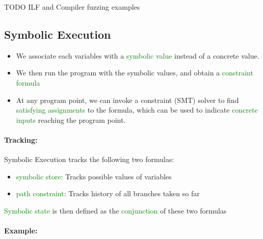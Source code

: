 TODO ILF and Compiler fuzzing examples
\subsection{Symbolic Execution}
\begin{itemize}
\item We associate each variables with a \textcolor{green}{symbolic value} instead of a concrete value.
\item We then run the program with the symbolic values, and obtain a \textcolor{green}{constraint formula}
\item At any program point, we can invoke a constraint (SMT) solver to find \textcolor{green}{satisfying assignments} to the formula, which can be used to indicate \textcolor{green}{concrete inputs} reaching the program point.
\end{itemize}{}

\paragraph{Tracking:}
Symbolic Execution tracks the following two formulas:
\begin{itemize}
    \item \textcolor{green}{symbolic store}: Tracks possible values of variables
    \item \textcolor{green}{path constraint}: Tracks history of all branches taken so far
\end{itemize}{}
\textcolor{green}{Symbolic state} is then defined as the \textcolor{green}{conjunction} of these two formulas
\paragraph{Example:\newline}

\noindent\begin{minipage}{0.5\linewidth}
    \centering      
    \def\svgwidth{\linewidth}
        
\end{minipage}
\begin{minipage}{0.5\linewidth}
    \centering      
    \def\svgwidth{\linewidth}
        
\end{minipage}
\begin{minipage}{0.5\linewidth}
    \centering      
    \def\svgwidth{\linewidth}
        
\end{minipage}
\begin{minipage}{0.5\linewidth}
    \centering      
    \def\svgwidth{\linewidth}
        
\end{minipage}

